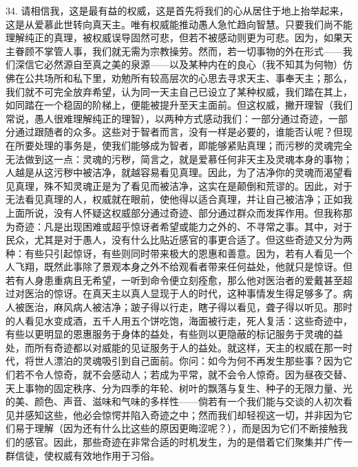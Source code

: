 34. 请相信我，这是最有益的权威，这是首先将我们的心从居住于地上抬举起来，这是从爱慕此世转向真天主。唯有权威能推动愚人急忙趋向智慧。只要我们尚不能理解纯正的真理，被权威误导固然可悲，但若不被感动则更为可悲。因为，如果天主眷顾不掌管人事，我们就无需为宗教操劳。然而，若一切事物的外在形式——我们深信它必然源自至真之美的泉源——以及某种内在的良心（我不知其为何物）仿佛在公共场所和私下里，劝勉所有较高层次的心思去寻求天主、事奉天主；那么，我们就不可完全放弃希望，认为同一天主自己已设立了某种权威，我们踏在其上，如同踏在一个稳固的阶梯上，便能被提升至天主面前。但这权威，撇开理智（我们常说，愚人很难理解纯正的理智），以两种方式感动我们：一部分通过奇迹，一部分通过跟随者的众多。这些对于智者而言，没有一样是必要的，谁能否认呢？但现在所要处理的事务是，使我们能够成为智者，即能够紧贴真理；而污秽的灵魂完全无法做到这一点：灵魂的污秽，简言之，就是爱慕任何非天主及灵魂本身的事物；人越是从这污秽中被洁净，就越容易看见真理。因此，为了洁净你的灵魂而渴望看见真理，殊不知灵魂正是为了看见而被洁净，这实在是颠倒和荒谬的。因此，对于无法看见真理的人，权威就在眼前，使他得以适合真理，并让自己被洁净；正如我上面所说，没有人怀疑这权威部分通过奇迹、部分通过群众而发挥作用。但我称那为奇迹：凡是出现困难或超乎惊讶者希望或能力之外的、不寻常之事。其中，对于民众，尤其是对于愚人，没有什么比贴近感官的事更合适了。但这些奇迹又分为两种：有些只引起惊讶，有些则同时带来极大的恩惠和善意。因为，若有人看见一个人飞翔，既然此事除了景观本身之外不给观看者带来任何益处，他就只是惊讶。但若有人身患重病且无希望，一听到命令便立刻痊愈，那么他对医治者的爱戴甚至超过对医治的惊讶。在真天主以真人显现于人的时代，这种事情发生得足够多了。病人被医治，麻风病人被洁净；跛子得以行走，瞎子得以看见，聋子得以听见。那时的人看见水变成酒，五千人用五个饼吃饱，海面被行走，死人复活：这些奇迹中，有些以更明显的恩惠服务于身体的益处，有些则以更隐蔽的标记服务于灵魂的益处，而所有奇迹都以对威能的见证服务于人的益处。就这样，天主的权威在那一时代，将世人漂泊的灵魂吸引到自己面前。你问：如今为何不再发生那些事？因为它们若不令人惊奇，就不会感动人；若成为平常，就不会令人惊奇。因为昼夜交替、天上事物的固定秩序、分为四季的年轮、树叶的飘落与复生、种子的无限力量、光的美、颜色、声音、滋味和气味的多样性——倘若有一个我们能与交谈的人初次看见并感知这些，他必会惊愕并陷入奇迹之中；然而我们却轻视这一切，并非因为它们易于理解（因为还有什么比这些的原因更晦涩呢？），而是因为它们不断接触我们的感官。因此，那些奇迹在非常合适的时机发生，为的是借着它们聚集并广传一群信徒，使权威有效地作用于习俗。\par


